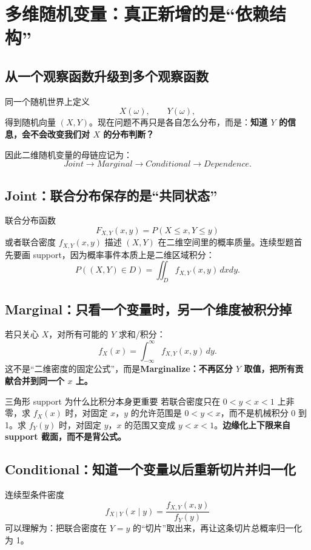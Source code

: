 \documentclass[11pt,a4paper,openany]{ctexbook}
\newcommand{\key}[1]{\textbf{\color{deep}#1}}
\begin{document}
\chapter{多维随机变量：真正新增的是“依赖结构”}

\section{从一个观察函数升级到多个观察函数}
同一个随机世界上定义
\[
X(\omega),\qquad Y(\omega),
\]
得到随机向量 $(X,Y)$。现在问题不再只是各自怎么分布，而是：\key{知道 $Y$ 的信息，会不会改变我们对 $X$ 的分布判断？}

因此二维随机变量的母链应记为：
\[
\boxed{Joint\to Marginal\to Conditional\to Dependence.}
\]

\section{Joint：联合分布保存的是“共同状态”}
联合分布函数
\[
F_{X,Y}(x,y)=P(X\le x,Y\le y)
\]
或者联合密度 $f_{X,Y}(x,y)$ 描述 $(X,Y)$ 在二维空间里的概率质量。连续型题首先要画 support，因为概率事件本质上是二维区域积分：
\[
P((X,Y)\in D)=\iint_D f_{X,Y}(x,y)\,dxdy.
\]

\section{Marginal：只看一个变量时，另一个维度被积分掉}
若只关心 $X$，对所有可能的 $Y$ 求和/积分：
\[
f_X(x)=\int_{-\infty}^{\infty}f_{X,Y}(x,y)\,dy.
\]
这不是“二维密度的固定公式”，而是\key{Marginalize：不再区分 $Y$ 取值，把所有贡献合并到同一个 $x$ 上。}

\begin{examplebox}{三角形 support 为什么比积分本身更重要}
若联合密度只在 $0<y<x<1$ 上非零，求 $f_X(x)$ 时，对固定 $x$，$y$ 的允许范围是 $0<y<x$，而不是机械积分 $0$ 到 1。求 $f_Y(y)$ 时，对固定 $y$，$x$ 的范围又变成 $y<x<1$。\key{边缘化上下限来自 support 截面，而不是背公式。}
\end{examplebox}

\section{Conditional：知道一个变量以后重新切片并归一化}
连续型条件密度
\[
f_{X\mid Y}(x\mid y)=\frac{f_{X,Y}(x,y)}{f_Y(y)}
\]
可以理解为：把联合密度在 $Y=y$ 的“切片”取出来，再让这条切片总概率归一化为 1。
\end{document}

